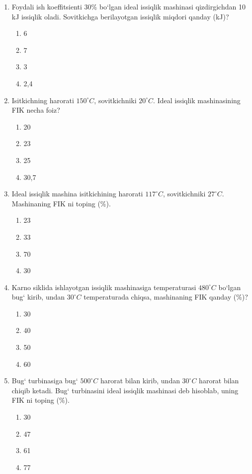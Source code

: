 \begin{enumerate}
\item Foydali ish koeffitsienti 30\% bo‘lgan ideal issiqlik mashinasi qizdirgichdan 10 kJ issiqlik oladi. Sovitkichga berilayotgan issiqlik miqdori qanday (kJ)?
\begin{enumerate}[label=\Alph*)]
\item 6
\item 7
\item 3
\item 2,4
\end{enumerate}

\item Isitkichning harorati $150^\circ C$, sovitkichniki $20^\circ C$. Ideal issiqlik mashinasining FIK necha foiz?
\begin{enumerate}[label=\Alph*)]
\item 20
\item 23
\item 25
\item 30,7
\end{enumerate}

\item Ideal issiqlik mashina isitkichining harorati $117^\circ C$, sovitkichniki $27^\circ C$. Mashinaning FIK ni toping (\%).
\begin{enumerate}[label=\Alph*)]
\item 23
\item 33
\item 70
\item 30
\end{enumerate}

\item Karno siklida ishlayotgan issiqlik mashinasiga temperaturasi $480^\circ C$ bo‘lgan bug‘ kirib, undan $30^\circ C$ temperaturada chiqsa, mashinaning FIK qanday (\%)?
\begin{enumerate}[label=\Alph*)]
\item 30
\item 40
\item 50
\item 60
\end{enumerate}

\item Bug‘ turbinasiga bug‘ $500^\circ C$ harorat bilan kirib, undan $30^\circ C$ harorat bilan chiqib ketadi. Bug‘ turbinasini ideal issiqlik mashinasi deb hisoblab, uning FIK ni toping (\%).
\begin{enumerate}[label=\Alph*)]
\item 30
\item 47
\item 61
\item 77
\end{enumerate}


\end{enumerate}
